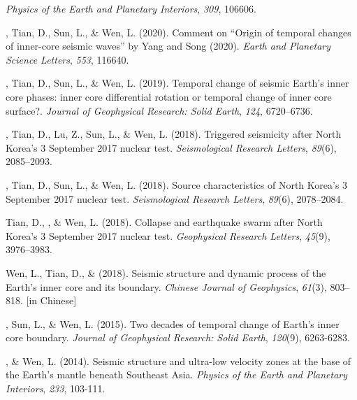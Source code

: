 \begin{etaremune}
    \textit{Physics of the Earth and Planetary Interiors}, \textit{309}, 106606.
\item
    \Yao\CS, Tian, D., Sun, L., \& Wen, L. (2020).
    Comment on “Origin of temporal changes of inner-core seismic waves” by Yang and Song (2020).
    \textit{Earth and Planetary Science Letters}, \textit{553}, 116640.
\item
    \Yao\CS, Tian, D., Sun, L., \& Wen, L. (2019).
    Temporal change of seismic Earth's inner core phases: inner core differential rotation or temporal change of inner core surface?.
    \textit{Journal of Geophysical Research: Solid Earth}, \textit{124}, 6720--6736.
\item
    \Yao\CS, Tian, D., Lu, Z., Sun, L., \& Wen, L. (2018).
    Triggered seismicity after North Korea's 3 September 2017 nuclear test.
    \textit{Seismological Research Letters}, \textit{89}(6), 2085--2093.
\item
    \Yao\CS, Tian, D., Sun, L., \& Wen, L. (2018).
	Source characteristics of North Korea's 3 September 2017 nuclear test.
    \textit{Seismological Research Letters}, \textit{89}(6), 2078--2084.
\item
    Tian, D., \Yao\CF, \& Wen, L. (2018).
    Collapse and earthquake swarm after North Korea's 3 September 2017 nuclear test.
    \textit{Geophysical Research Letters}, \textit{45}(9), 3976--3983.
\item
    Wen, L., Tian, D., \& \Yao (2018).
    Seismic structure and dynamic process of the Earth's inner core and its boundary.
    \textit{Chinese Journal of Geophysics}, \textit{61}(3), 803--818.
     [in Chinese]
\item
    \Yao\CS, Sun, L., \& Wen, L. (2015).
    Two decades of temporal change of Earth's inner core boundary.
    \textit{Journal of Geophysical Research: Solid Earth}, \textit{120}(9), 6263-6283.
\item
    \Yao\CS, \& Wen, L. (2014).
    Seismic structure and ultra-low velocity zones at the base of the Earth's mantle beneath Southeast Asia.
    \textit{Physics of the Earth and Planetary Interiors}, \textit{233}, 103-111.
\end{etaremune}


